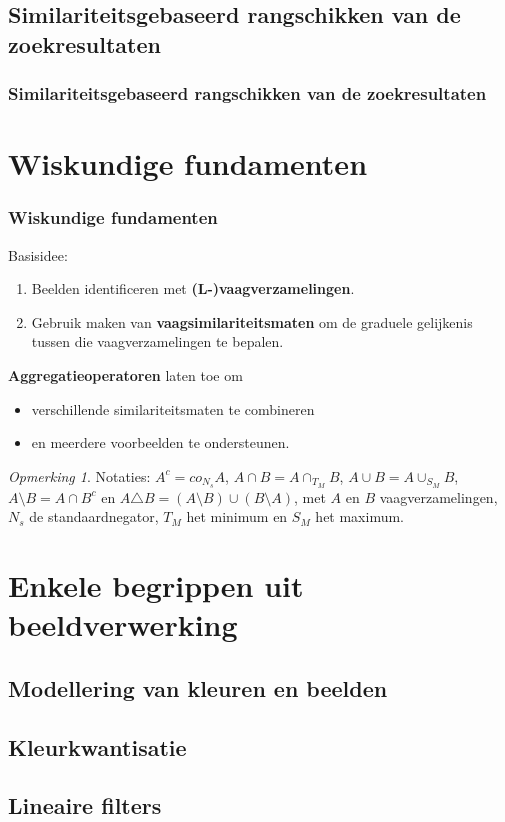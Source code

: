 \documentclass[dutch]{beamer}
\theoremstyle{definition}
\theoremstyle{remark}
\newtheorem{opmerking}[theorem]{Opmerking}
\theoremstyle{example}
\begin{document}
\subsection{Similariteitsgebaseerd rangschikken van de zoekresultaten}
\frame
{
  \frametitle{Similariteitsgebaseerd rangschikken van de zoekresultaten}
}

\section{Wiskundige fundamenten}
\frame
{
  \frametitle{Wiskundige fundamenten}

  Basisidee:
  \begin{enumerate}
  \item Beelden identificeren met \textbf{(L-)vaagverzamelingen}.
  \item Gebruik maken van \textbf{vaagsimilariteitsmaten} om de graduele 
  gelijkenis tussen die vaagverzamelingen te bepalen.
  \end{enumerate}
  
  \textbf{Aggregatieoperatoren} laten toe om
  \begin{itemize}
  \item verschillende similariteitsmaten te combineren
  \item en meerdere voorbeelden te ondersteunen.
  \end{itemize}
  
  \begin{opmerking}
  Notaties: $A^c = co_{N_s} A$, $A \cap B = A \cap_{T_M} B$, $A \cup B = A \cup_{S_M} B$,
  $A \setminus B = A \cap B^c$ en $A \triangle B = (A \setminus B) \cup (B \setminus A)$,
  met $A$ en $B$ vaagverzamelingen, $N_s$ de standaardnegator, $T_M$ het minimum en $S_M$ het maximum.
  \end{opmerking}
}

\section{Enkele begrippen uit beeldverwerking}
\subsection{Modellering van kleuren en beelden}
\subsection{Kleurkwantisatie}
\subsection{Lineaire filters}
\end{document}
